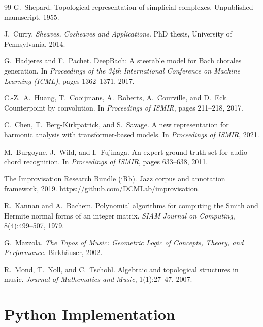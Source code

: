 \documentclass[12pt,a4paper]{article}
\begin{document}
\begin{thebibliography}{99}
G.~Shepard.
\newblock Topological representation of simplicial complexes.
\newblock Unpublished manuscript, 1955.

J.~Curry.
\newblock \emph{Sheaves, Cosheaves and Applications}.
\newblock PhD thesis, University of Pennsylvania, 2014.

G.~Hadjeres and F.~Pachet.
\newblock DeepBach: A steerable model for Bach chorales generation.
\newblock In \emph{Proceedings of the 34th International Conference on Machine Learning (ICML)}, 
pages 1362--1371, 2017.

C.-Z.~A.~Huang, T.~Cooijmans, A.~Roberts, A.~Courville, and D.~Eck.
\newblock Counterpoint by convolution.
\newblock In \emph{Proceedings of ISMIR}, pages 211--218, 2017.

C.~Chen, T.~Berg-Kirkpatrick, and S.~Savage.
\newblock A new representation for harmonic analysis with transformer-based models.
\newblock In \emph{Proceedings of ISMIR}, 2021.

M.~Burgoyne, J.~Wild, and I.~Fujinaga.
\newblock An expert ground-truth set for audio chord recognition.
\newblock In \emph{Proceedings of ISMIR}, pages 633--638, 2011.

The Improvisation Research Bundle (iRb).
\newblock Jazz corpus and annotation framework, 2019.
\newblock \url{https://github.com/DCMLab/improvisation}.

R.~Kannan and A.~Bachem.
\newblock Polynomial algorithms for computing the Smith and Hermite normal forms 
  of an integer matrix.
\newblock \emph{SIAM Journal on Computing}, 8(4):499--507, 1979.

G.~Mazzola.
\newblock \emph{The Topos of Music: Geometric Logic of Concepts, Theory, and Performance}.
\newblock Birkh\"auser, 2002.

R.~Mond, T.~Noll, and C.~Tschohl.
\newblock Algebraic and topological structures in music.
\newblock \emph{Journal of Mathematics and Music}, 1(1):27--47, 2007.

\end{thebibliography}

\appendix
\section{Python Implementation}\label{sec:appendix-code}
\end{document}
